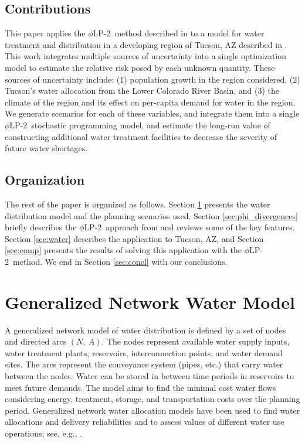 \documentclass[opre,nonblindrev]{informs3} %
\newcommand{\plp}{$\phi$LP-2}
\begin{document}
\subsection{Contributions}

This paper applies the \plp\ method described in \cite{love2013phi} to a model for water treatment and distribution in a developing region of Tucson, AZ described in \cite{woods2012centralized}.
This work integrates multiple sources of uncertainty into a single optimization model to estimate the relative risk posed by each unknown quantity.
These sources of uncertainty include: (1) population growth in the region considered, (2) Tucson's water allocation from the Lower Colorado River Basin, and (3) the climate of the region and its effect on per-capita demand for water in the region.
We generate scenarios for each of these variables, and integrate them into a single \plp\ stochastic programming model, and estimate the long-run value of constructing additional water treatment facilities to decrease the severity of future water shortages.

\subsection{Organization}

The rest of the paper is organized as follows.
Section \ref{sec:network_model} presents the water distribution model and the planning scenarios used.
Section \ref{sec:phi_divergences} briefly describes the \plp\ approach from \cite{love2013phi} and reviews some of the key features.
Section \ref{sec:water} describes the application to Tucson, AZ, and Section \ref{sec:comp} presents the results of solving this application with the \plp\ method.
We end in Section \ref{sec:concl} with our conclusions.



\section{Generalized Network Water Model}
\label{sec:network_model}

A generalized network model of water distribution is defined by a set of nodes and directed arcs $(N,\: A)$.
The nodes represent available water supply inputs, water treatment plants, reservoirs, interconnection points, and water demand sites.
The arcs represent the conveyance system (pipes, etc.) that carry water between the nodes.
Water can be stored in between time periods in reservoirs to meet future demands.
The model aims to find the minimal cost water flows considering energy, treatment, storage, and transportation costs over the planning period. 
Generalized network water allocation models have been used to find water allocations and delivery reliabilities and to assess values of different water use operations; see, e.g., \cite{draper_etal_03}. 
\end{document}
